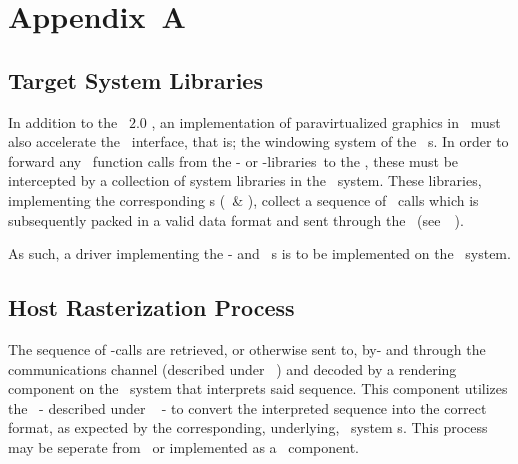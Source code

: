 
\chapter*{Appendix~A}
\label{cha:appendixa}

\section*{Target System Libraries}
\label{sec:appendixa_guestsystemlibraries}

In addition to the \termopengles ~$2.0$ \termapi , an implementation of paravirtualized graphics in \termsimics\ must also accelerate the \termegl\ interface, that is; the windowing system of the \termopengl\ \termapi s.
In order to forward any \termapi\ function calls from the \termopengles - or \termegl-libraries\ to the \termhost, these must be intercepted by a collection of system libraries in the \termtarget\ system.
These libraries, implementing the corresponding \termabi s (\termopengles\ \& \termegl), collect a sequence of \termapi\ calls which is subsequently packed in a valid data format and sent through the \termsimicspipe\ (see~\termsec ~).

As such, a driver implementing the \termopengl - and \termegl\ \termabi s is to be implemented on the \termtarget\ system.

\section*{Host Rasterization Process}
\label{sec:appendixa_hostrastterizationprocess}

The sequence of \termapi -calls are retrieved, or otherwise sent to, by- and through the communications channel (described under \termsec ~) and decoded by a rendering component on the \termhost\ system that interprets said sequence.
This component utilizes the \termhosttranslatorlibraries\ - described under \termsec ~ - to convert the interpreted sequence into the correct format, as expected by the corresponding, underlying, \termhost\ system \termabi s.
This process may be seperate from \termsimics\ or implemented as a \termsimics ~component.

